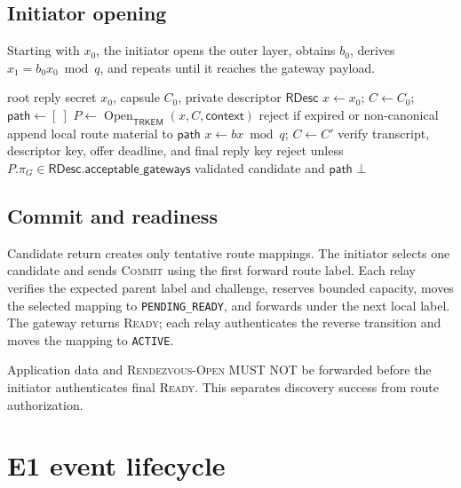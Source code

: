 \documentclass[11pt,oneside]{article}
\newcommand{\Open}{\operatorname{Open}}
\newcommand{\code}[1]{\texttt{#1}}
\begin{document}
\subsection{Initiator opening}

Starting with $x_0$, the initiator opens the outer layer, obtains $b_0$, derives $x_1=b_0x_0\bmod q$, and repeats until it reaches the gateway payload.

\begin{algorithm}[ht]
\caption{Initiator validates one nested candidate}
\label{alg:opencandidate}
\begin{algorithmic}[1]
\Require root reply secret $x_0$, capsule $C_0$, private descriptor $\mathsf{RDesc}$
\State $x\gets x_0$; $C\gets C_0$; $\mathsf{path}\gets[\ ]$
\Loop
  \State $P\gets\Open_{\mathsf{TRKEM}}(x,C,\mathsf{context})$
    \State reject if expired or non-canonical
    \State append local route material to $\mathsf{path}$
    \State $x\gets bx\bmod q$; $C\gets C'$
    \State verify transcript, descriptor key, offer deadline, and final reply key
    \State reject unless $P.\pi_G\in\mathsf{RDesc}.\mathsf{acceptable\_gateways}$
    \State \Return validated candidate and $\mathsf{path}$
  \Else
    \State \Return $\bot$
  \EndIf
\EndLoop
\end{algorithmic}
\end{algorithm}

\subsection{Commit and readiness}

Candidate return creates only tentative route mappings. The initiator selects one candidate and sends \textsc{Commit} using the first forward route label. Each relay verifies the expected parent label and challenge, reserves bounded capacity, moves the selected mapping to \code{PENDING\_READY}, and forwards under the next local label. The gateway returns \textsc{Ready}; each relay authenticates the reverse transition and moves the mapping to \code{ACTIVE}.

Application data and \textsc{Rendezvous-Open} MUST NOT be forwarded before the initiator authenticates final \textsc{Ready}. This separates discovery success from route authorization.

\section{E1 event lifecycle}
\label{sec:lifecycle}
\end{document}
